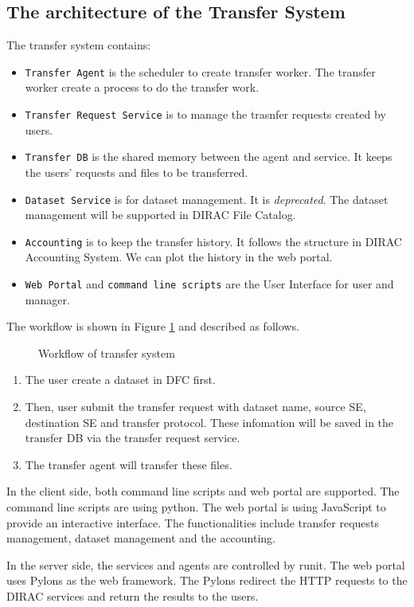 \subsection{The architecture of the Transfer System}

The transfer system contains:

\begin{itemize}
    \item {\tt Transfer Agent} is the scheduler to create transfer worker.
          The transfer worker create a process to do the transfer work.
    \item {\tt Transfer Request Service} is to manage the trasnfer requests
          created by users.
    \item {\tt Transfer DB} is the shared memory between the agent and 
          service. It keeps the users' requests and files to be transferred.
    \item {\tt Dataset Service} is for dataset management. It is 
          {\em deprecated}. The dataset management will be supported in DIRAC 
          File Catalog.
    \item {\tt Accounting} is to keep the transfer history.
          It follows the structure in DIRAC Accounting System.
          We can plot the history in the web portal.
    \item {\tt Web Portal} and {\tt command line scripts} are the 
          User Interface for user and manager.
\end{itemize}

The workflow is shown in Figure \ref{fig:workflow} and described as follows.
\begin{figure}
    
    \caption{Workflow of transfer system} \label{fig:workflow}
\end{figure}

\begin{enumerate}
\item The user create a dataset in DFC first.
\item Then, user submit the transfer request with dataset name,
source SE, destination SE and transfer protocol.
These infomation will be saved in the transfer DB via
the transfer request service.
\item The transfer agent will transfer these files.
\end{enumerate}

In the client side, both command line scripts and web portal are supported.
The command line scripts are using python. The web portal is using 
JavaScript to provide an interactive interface. The functionalities
include transfer requests management, dataset management and the 
accounting.

In the server side, the services and agents are controlled by runit.
The web portal uses Pylons as the web framework.
The Pylons redirect the HTTP requests to the DIRAC services and 
return the results to the users.
